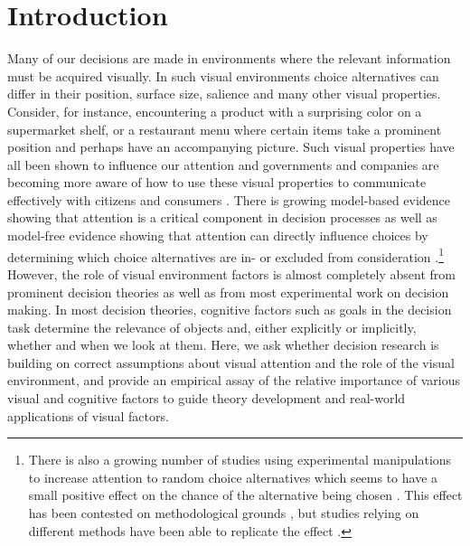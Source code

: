 
\section{Introduction}

Many of our decisions are made in environments where the relevant information must be acquired visually. In such visual environments choice alternatives can differ in their position, surface size, salience and many other visual properties. Consider, for instance, encountering a product with a surprising color on a supermarket shelf, or a restaurant menu where certain items take a prominent position and perhaps have an accompanying picture. Such visual properties have all been shown to influence our attention \citep{corbetta2002a,borji2012a,dehaene2003a,clarke2014a, rosenholtz2007a} and governments and companies are becoming more aware of how to use these visual properties to communicate effectively with citizens and consumers \citep{orquinwedel2020}. There is growing model-based evidence showing that attention is a critical component in decision processes \citep{krajbich2010a, stojic2020uncertainty, callaway2019a, gluth2018, gluth2020} as well as model-free evidence showing that attention can directly influence choices by determining which choice alternatives are in- or excluded from consideration \citep{chandon2009a, gidlof2013, gidloef2017a}.\footnote{There is also a growing number of studies using experimental manipulations to increase attention to random choice alternatives which seems to have a small positive effect on the chance of the alternative being chosen \citep{armel2008, paernamets2015a, shimojo2003a}. This effect has been contested on methodological grounds \citep{Newell2018, ghaffari2018a}, but studies relying on different methods have been able to replicate the effect \citep{liu2020a, Fisher2020}.} However, the role of visual environment factors is almost completely absent from prominent decision theories as well as from most experimental work on decision making. In most decision theories, cognitive factors such as goals in the decision task determine the relevance of objects and, either explicitly or implicitly, whether and when we look at them. Here, we ask whether decision research is building on correct assumptions about visual attention and the role of the visual environment, and provide an empirical assay of the relative importance of various visual and cognitive factors to guide theory development and real-world applications of visual factors.\\

